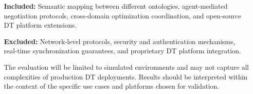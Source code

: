 \textbf{Included:} 
Semantic mapping between different ontologies,
  agent-mediated negotiation protocols, cross-domain optimization coordination, and
  open-source DT platform extensions.

\textbf{Excluded:}
Network-level protocols,
  security and authentication mechanisms,
  real-time synchronization guarantees, and
  proprietary DT platform integration.

The evaluation will be limited to simulated environments and may not capture all complexities of production DT deployments.
Results should be interpreted within the context of the specific use cases and platforms chosen for validation.

